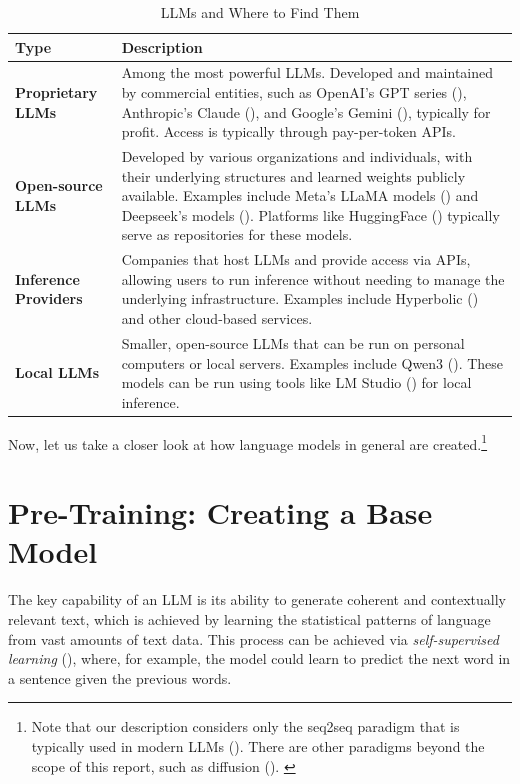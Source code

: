 \documentclass{article} %
\begin{document}
\begin{table}[h]
\centering
\begin{tabular}{p{}p{}}
\toprule
\textbf{Type} & \textbf{Description} \\
\midrule
\textbf{Proprietary LLMs} & Among the most powerful LLMs. Developed and maintained by commercial entities, 
    such as OpenAI's GPT series (\cite{ChatGPT-2022}), Anthropic's Claude (\cite{Anthropic-2025}), 
    and Google's Gemini (\cite{Google-2025}), typically for profit. Access is typically through pay-per-token APIs. \\
\addlinespace
\textbf{Open-source LLMs} & Developed by various organizations and individuals, 
    with their underlying structures and learned weights publicly available. 
    Examples include Meta's LLaMA models (\cite{Meta-2023}) and Deepseek's models (\cite{Deepseek-2024,Deepseek-2025}). 
    Platforms like HuggingFace (\cite{Huggingface}) typically serve as repositories for these models. \\
\addlinespace
\textbf{Inference Providers} & Companies that host LLMs and provide access via APIs, 
    allowing users to run inference without needing to manage the underlying infrastructure. 
    Examples include Hyperbolic (\cite{Hyperbolic}) and other cloud-based services. \\
\addlinespace
\textbf{Local LLMs} & Smaller, open-source LLMs that can be run on personal computers 
    or local servers. Examples include Qwen3 (\cite{Alibaba-2025}). 
    These models can be run using tools like LM Studio (\cite{LMStudio}) for local inference. \\
\bottomrule
\end{tabular}
\caption{LLMs and Where to Find Them}
\label{tab:llm_types}
\end{table}

Now, let us take a closer look at how language models in general are created.\footnote{
    Note that our description considers only the seq2seq paradigm that is typically used in modern LLMs (\cite{Sutskever-et-al-2014}).
    There are other paradigms beyond the scope of this report, such as diffusion (\cite{Nie-et-al-2025}).
    \label{fn:seq2seq}
}

\section{Pre-Training: Creating a Base Model}
The key capability of an LLM is its ability to generate coherent and contextually relevant text,
which is achieved by learning the statistical patterns of language from vast amounts of text data.
This process can be achieved via \textit{self-supervised learning} (\cite{Karpathy-2025}),
where, for example, the model could learn to predict the next word in a sentence given the previous words. 
\end{document}
